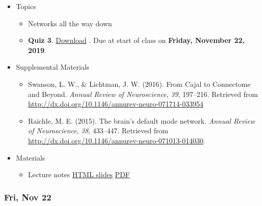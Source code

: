 \documentclass[]{article}
\providecommand{\tightlist}{%
  \setlength{\itemsep}{0pt}\setlength{\parskip}{0pt}}
\begin{document}
\begin{itemize}
\tightlist
\item
  Topics

  \begin{itemize}
  \tightlist
  \item
    Networks all the way down
  \item
    \textbf{Quiz 3}. \textbar{} \href{}{Download} \textbar{}. Due at
    start of class on \textbf{Friday, November 22, 2019}.
  \end{itemize}
\item
  Supplemental Materials

  \begin{itemize}
  \tightlist
  \item
    Swanson, L. W., \& Lichtman, J. W. (2016). From Cajal to Connectome
    and Beyond. \emph{Annual Review of Neuroscience}, \emph{39},
    197--216. Retrieved from
    \url{http://dx.doi.org/10.1146/annurev-neuro-071714-033954}
  \item
    Raichle, M. E. (2015). The brain's default mode network.
    \emph{Annual Review of Neuroscience}, \emph{38}, 433--447. Retrieved
    from \url{http://dx.doi.org/10.1146/annurev-neuro-071013-014030}.
  \end{itemize}
\item
  Materials

  \begin{itemize}
  \tightlist
  \item
    Lecture notes \textbar{} \href{}{HTML slides} \textbar{}
    \href{}{PDF}
  \end{itemize}
\end{itemize}

\hypertarget{fri-nov-22}{%
\subsubsection{Fri, Nov 22}\label{fri-nov-22}}
\end{document}
